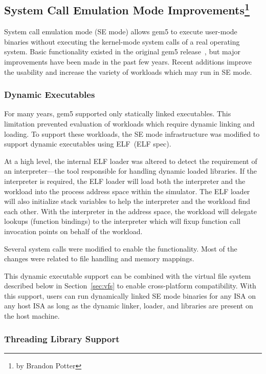 \subsection[System Call Emulation Mode Improvements]{System Call Emulation Mode Improvements\footnote{by Brandon Potter}}

System call emulation mode (SE mode) allows gem5 to execute user-mode binaries without executing the kernel-mode system calls of a real operating system.
Basic functionality existed in the original gem5 release~\cite{Binkert-gem5-2011}, but major improvements have been made in the past few years.
Recent additions improve the usability and increase the variety of workloads which may run in SE mode.

\subsubsection{Dynamic Executables}

For many years, gem5 supported only statically linked executables.
This limitation prevented evaluation of workloads which require dynamic linking and loading.
To support these workloads, the SE mode infrastructure was modified to support dynamic executables using ELF~\cite{}(ELF spec).

At a high level, the internal ELF loader was altered to detect the requirement of an interpreter---the tool responsible for handling dynamic loaded libraries.
If the interpreter is required, the ELF loader will load both the interpreter and the workload into the process address space within the simulator.
The ELF loader will also initialize stack variables to help the interpreter and the workload find each other.
With the interpreter in the address space, the workload will delegate lookups (function bindings) to the interpreter which will fixup function call invocation points on behalf of the workload.

Several system calls were modified to enable the functionality.
Most of the changes were related to file handling and memory mappings.

This dynamic executable support can be combined with the virtual file system described below in Section~\ref{sec:vfs} to enable cross-platform compatibility.
With this support, users can run dynamically linked SE mode binaries for any ISA on any host ISA as long as the dynamic linker, loader, and libraries are present on the host machine.

\subsubsection{Threading Library Support}

